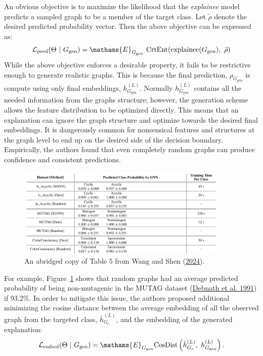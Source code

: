 \documentclass[
  11pt,
  letterpaper,
]{article}
\begin{document}
\quad An obvious objective is to maximize the likelihood that the
\emph{explainee} model predicts a sampled graph to be a member of the
target class. Let \(\tilde{\rho}\) denote the desired predicted
probability vector. Then the above objective can be expressed as:
\begin{equation}
        \mathcal{L}_\text{pred} (\Theta \ | \ G_\text{gen}) = \mathams{E}_{G_\text{gen}} \ \text{CrtEnt} (\text{explainee}(G_\text{gen}), \ \tilde{\rho})
    \end{equation} While the above objective enforces a desirable
property, it fails to be restrictive enough to generate realistic
graphs. This is because the final prediction, \(\rho_{G_{\text{gen}}}\)
is compute using only final embeddings, \(h^{(L)}_{G_{\text{gen}}}\).
Normally \(h^{(L)}_{G_{\text{gen}}}\) contains all the needed
information from the graphs structure; however, the generation scheme
allows the feature distribution to be optimized directly. This means
that an explanation can ignore the graph structure and optimize towards
the desired final embeddings. It is dangerously common for nonsensical
features and structures at the graph level to end up on the desired side
of the decision boundary. Empirically, the authors found that even
completely random graphs can produce confidence and consistent
predictions.

\begin{figure}

{\centering \includegraphics[width=0.9\textwidth,height=\textheight]{figures/random_baseline.png}

}

\caption{\label{fig-random-baseline}An abridged copy of Table 5 from
Wang and Shen (\protect\hyperlink{ref-Wang_Shen_2024}{2024}).}

\end{figure}

For example, Figure~\ref{fig-random-baseline} shows that random graphs
had an average predicted probability of being non-mutagenic in the MUTAG
dataset (\protect\hyperlink{ref-Debnath_1991}{Debnath et al. 1991}) if
93.2\%. In order to mitigate this issue, the authors proposed additional
minimizing the cosine distance between the average embedding of all the
observed graph from the targeted class, \(\bar h^{(L)}_{G_c}\), and the
embedding of the generated explanation: \begin{equation}
       \mathcal{L}_{\text{embed}}(\Theta \ | \ G_\text{gen}) = 
            \mathams{E}_{G_\text{gen}}
            \text{CosDist}\left( \bar h^{(L)}_{G_c}, \ h^{(L)}_{G_\text{gen}} \right). 
    \end{equation}
\end{document}

